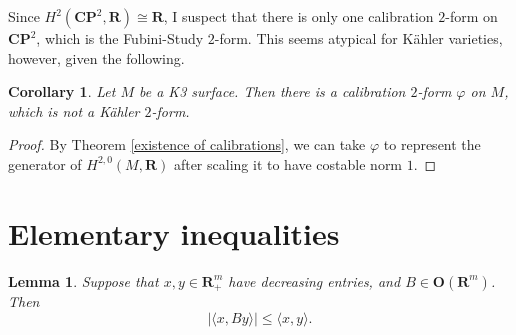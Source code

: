 \documentclass[reqno,11pt]{amsart}
\newcommand{\RR}{\mathbf{R}}
\newcommand{\CC}{\mathbf{C}}
\newcommand{\PP}{\mathbf P}
\newcommand{\Orth}{\mathbf{O}}
\newtheorem{lemma}[theorem]{Lemma}
\newtheorem{corollary}[theorem]{Corollary}
\theoremstyle{definition}
\numberwithin{equation}{section}
\begin{document}
Since $H^2(\CC \PP^2, \RR) \cong \RR$, I suspect that there is only one calibration $2$-form on $\CC \PP^2$, which is the Fubini-Study $2$-form.
This seems atypical for K\"ahler varieties, however, given the following.

\begin{corollary}
Let $M$ be a K3 surface. Then there is a calibration $2$-form $\varphi$ on $M$, which is not a K\"ahler $2$-form.
\end{corollary}
\begin{proof}
By Theorem \ref{existence of calibrations}, we can take $\varphi$ to represent the generator of $H^{2, 0}(M, \RR)$ after scaling it to have costable norm $1$.
\end{proof}


\appendix 
\section{Elementary inequalities}

\begin{lemma}
Suppose that $x, y \in \RR^m_+$ have decreasing entries, and $B \in \Orth(\RR^m)$. Then
\begin{equation}\label{permute to decreasing}
|\langle x, By\rangle| \leq \langle x, y\rangle.
\end{equation}
\end{lemma}

\printbibliography
\end{document}
